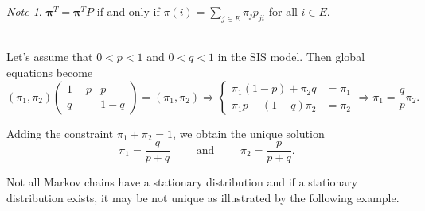 \documentclass[11pt]{article}\usepackage[]{graphicx}\usepackage[]{color}
\numberwithin{algorithm}{section}
\theoremstyle{remark}
\newtheorem*{mynote}{Note}
\theoremstyle{definition}
\newenvironment{example}[1]{\begin{trivlist}
\item[\hskip \labelsep {\bfseries Example}: \underline{#1}]\ \\}{\end{trivlist}}
\begin{document}
\begin{mynote}
  $\boldsymbol{\pi}^T = \boldsymbol{\pi}^T P$ if and only if $\pi(i) = \sum_{j \in E} \pi_jp_{ji}$ for all $i \in E$.
\end{mynote}


\begin{example}{SIS model continued}
  Let's assume that $0 < p < 1$ and $0 < q < 1$ in the SIS model. Then global equations become
  \begin{equation*}
    (\pi_1, \pi_2) 
    \begin{pmatrix}
      1-p & p \\
      q &1-q
    \end{pmatrix}=
    (\pi_1,\pi_2) 
    \Rightarrow
  \begin{cases}
    \pi_1(1-p) + \pi_2 q &= \pi_1\\
    \pi_1 p + (1-q)\pi_2 &= \pi_2
  \end{cases}
  \Rightarrow \pi_1 = \frac{q}{p} \pi_2.
  \end{equation*} 
\end{example}
Adding the constraint $\pi_1 + \pi_2 = 1$, we obtain the unique solution 
\begin{equation*}
  \pi_1 = \frac{q}{p+q} \qquad \text{ and } \qquad \pi_2 = \frac{p}{p+q}.
\end{equation*}

Not all Markov chains have a stationary distribution and if a stationary distribution exists, it may be
not unique as illustrated by the following example.

\end{document}
